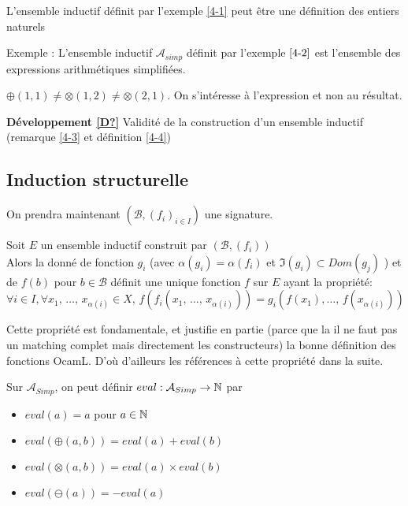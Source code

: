 \begin{example}
	L'ensemble inductif définit par l'exemple \ref{4-1} peut être une définition des entiers naturels \label{4-6}
\end{example}

\begin{example}
	Exemple : L'ensemble inductif $\mathcal A_{simp}$ définit par l'exemple $\ref{4-2}$ est l'ensemble des expressions arithmétiques simplifiées.
\end{example}

\begin{rem}
	$\oplus(1, 1) \neq \otimes(1, 2) \neq \otimes(2, 1)$. On s'intéresse à l'expression et non au résultat.
\end{rem}

\noindent \textbf{Développement \ref{D?}} Validité de la construction d'un ensemble inductif (remarque \ref{4-3} et définition \ref{4-4})

\subsection{Induction structurelle}
On prendra maintenant $(\mathcal B, (f_i)_{i \in I})$ une signature.

\begin{proposition}
	\label{4-5}
	Soit $E$ un ensemble inductif construit par $(\mathcal B, (f_i))$\\
	
	Alors la donné de fonction $g_i$ (avec $\alpha(g_i) = \alpha(f_i)$ et $\Im(g_i) \subset Dom(g_j)$ ) et de $f(b)$ pour $b \in \mathcal B$ définit une unique fonction $f$ sur $E$ ayant la propriété:
	$$\forall i \in I, \forall x_1, \, \dots , \, x_{\alpha(i)} \in X, \, f\left(f_i(x_1, \, \dots, \, x_{\alpha(i)})\right) =  g_i\left(f(x_1), \dots, \, f(x_{\alpha(i)})\right)$$
\end{proposition}

\begin{com}
	Cette propriété est fondamentale, et justifie en partie (parce que la il ne faut pas un matching complet mais directement les constructeurs) la bonne définition des fonctions OcamL. D'où d'ailleurs les références à cette propriété dans la suite.
\end{com}


\begin{example}
	Sur $\mathcal A_{Simp}$, on peut définir $eval : \mathcal A_{Simp} \to \mathbb{N}$ par \begin{itemize}
		\item $eval(a) = a$ pour $a \in \mathbb{N}$
		\item $eval(\oplus(a, b)) = eval(a) + eval(b)$
		\item $eval(\otimes(a, b)) = eval(a) \times  eval(b)$
		\item $eval(\ominus(a)) = - eval(a)$
	\end{itemize}
\end{example}

